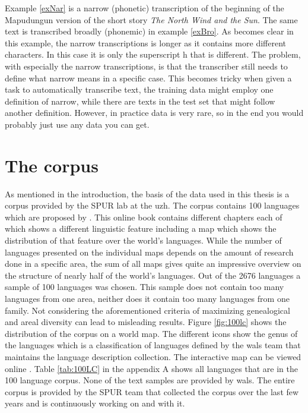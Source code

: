 Example \ref{exNar} is a narrow (phonetic) transcription of the beginning of the Mapudungun version of the short story \textit{The North Wind and the Sun}. The same text is transcribed broadly (phonemic) in example \ref{exBro}. As becomes clear in this example, the narrow transcriptions is longer as it contains more different characters. In this case it is only the superscript h that is different. The problem, with especially the narrow transcriptions, is that the transcriber still needs to define what narrow means in a specific case. This becomes tricky when given a task to automatically transcribe text, the training data might employ one definition of narrow, while there are texts in the test set that might follow another definition. However, in practice data is very rare, so in the end you would probably just use any data you can get.
  
\section{The corpus}
\label{corpus}
As mentioned in the introduction, the basis of the data used in this thesis is a corpus provided by the SPUR lab at the \ac{uzh}. The corpus contains 100 languages which are proposed by \citet{Comrie&Dryer.2013}. This online book contains different chapters each of which shows a different linguistic feature including a map which shows the distribution of that feature over the world's languages. While the number of languages presented on the individual maps depends on the amount of research done in a specific area, the sum of all maps gives quite an impressive overview on the structure of nearly half of the world's languages. Out of the 2676 languages a sample of 100 languages was chosen. This sample does not contain too many languages from one area, neither does it contain too many languages from one family. Not considering the aforementioned criteria of maximizing genealogical and areal diversity can lead to misleading results. Figure \ref{fig:100lc} shows the distribution of the corpus on a world map. The different icons show the genus of the languages which is a classification of languages defined by the \ac{wals} team that maintains the language description collection. The interactive map can be viewed online \citep{100LC.21.07.2021}. Table \ref{tab:100LC} in the appendix A shows all languages that are in the 100 language corpus. None of the text samples are provided by \ac{wals}. The entire corpus is provided by the SPUR team that collected the corpus over the last few years and is continuously working on and with it.

